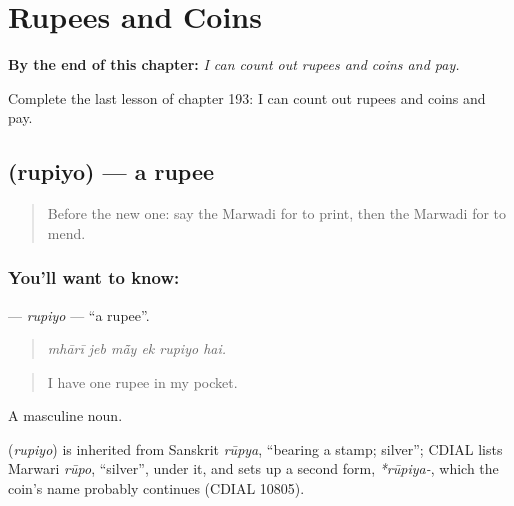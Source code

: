 
\chapter{Rupees and Coins}
\label{ch:mw-rupees-and-coins}

\begin{chapteropening}
\textbf{By the end of this chapter:} \emph{I can count out rupees and coins and pay.}

Complete the last lesson of chapter 193: I can count out rupees and coins and pay.
\end{chapteropening}

\section[\texorpdfstring{\mw{रुपियो} (rupiyo)}{रुपियो (rupiyo)}]{ (rupiyo) — a rupee}

\label{lesson:MW-C193-rupiyo}



\begin{quote}
Before the new one: say the Marwadi for to print, then the Marwadi for to mend.
\end{quote}

\subsection*{You'll want to know: }
\textbf{} — \emph{rupiyo} — \textquotedblleft{}a rupee\textquotedblright{}.

\begin{quote}
     
\end{quote}

\begin{quote}
\emph{mhārī jeb mā̃y ek rupiyo hai.}
\end{quote}

\begin{quote}
I have one rupee in my pocket.
\end{quote}

A masculine noun.

\begin{cousinweb}
\textbf{} (\emph{rupiyo}) is inherited from Sanskrit \emph{rūpya}, \textquotedblleft{}bearing a stamp; silver\textquotedblright{}; CDIAL lists Marwari \emph{rūpo}, \textquotedblleft{}silver\textquotedblright{}, under it, and sets up a second form, \emph{*rūpiya-}, which the coin's name probably continues (CDIAL 10805).
\end{cousinweb}

